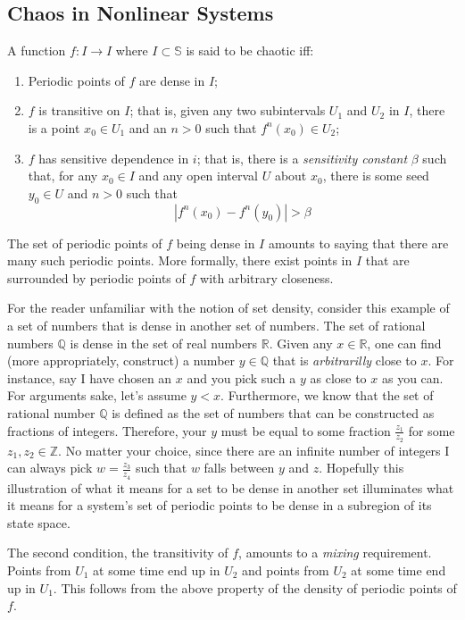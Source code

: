 \documentclass{elsart1p}
\begin{document}
\subsection{Chaos in Nonlinear Systems}
A function $f : I \rightarrow I$ where $I \subset \mathbb{S}$ is said to be chaotic \cite{hirsch} iff:
\begin{enumerate}
\item Periodic points of $f$ are dense in $I$;
\item $f$ is transitive on $I$;  that is, given any two subintervals $U_{1}$
and $U_{2}$ in $I$, there is a point $x_{0} \in U_{1}$ and an $n > 0$ such 
that $f^{n}(x_{0}) \in U_{2}$;
\item $f$ has sensitive dependence in $i$; that is, there is a
\textit{sensitivity constant} $\beta$ such that, for any $x_{0} \in I$ and
any open interval $U$ about $x_{0}$, there is some seed $y_{0} \in U$ and 
$n > 0$ such that
$$|f^{n}(x_{0}) - f^{n}(y_{0})| > \beta$$
\end{enumerate}

The set of periodic points of $f$ being dense in $I$ amounts to saying that
there are many such periodic points.  More formally, there exist points in $I$
that are surrounded by periodic points of $f$ with arbitrary closeness.

For the reader unfamiliar with the notion of set density, consider
this example of a set of numbers that is dense in another set of numbers.
The set of rational numbers $\mathbb{Q}$ is dense in the set of real numbers 
$\mathbb{R}$.  Given any $x \in \mathbb{R}$, one can find (more 
appropriately, construct) a number $y \in \mathbb{Q}$ that is 
\textit{arbitrarilly} close to $x$.  For instance, say I have chosen an $x$
and you pick such a $y$ as close to $x$ as you can.
For arguments sake, let's assume $y < x$.  Furthermore, we know that
the set of rational number $\mathbb{Q}$ is defined as the set of numbers
that can be constructed as fractions of integers.  Therefore, your 
$y$ must be equal to some fraction $\frac{z_{1}}{z_{2}}$ for some $z_{1}, z_{2} \in \mathbb{Z}$.  No matter
your choice, since there are an infinite number of integers 
I can always pick $w = \frac{z_{3}}{z_{4}}$ such that $w$ falls between $y$ and $z$.  Hopefully
this illustration of what it means for a set to be dense in another set
illuminates what it means for a system's set of periodic points to be
dense in a subregion of its state space.

The second condition, the transitivity of $f$, amounts to a \textit{mixing} 
requirement.  Points from $U_{1}$ at some time end up in $U_{2}$ and points 
from $U_{2}$ at some time end up in $U_{1}$.  This follows from the above 
property of the density of periodic points of $f$.
\end{document}
